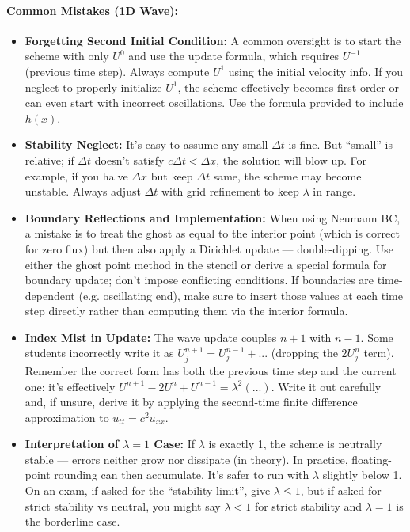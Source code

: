 \documentclass[a4paper,11pt]{article}
\begin{document}
\paragraph{Common Mistakes (1D Wave):}
\begin{itemize}
    \item \textbf{Forgetting Second Initial Condition:} A common oversight is to start the scheme with only $U^0$ and use the update formula, which requires $U^{-1}$ (previous time step). Always compute $U^1$ using the initial velocity info. If you neglect to properly initialize $U^1$, the scheme effectively becomes first-order or can even start with incorrect oscillations. Use the formula provided to include $h(x)$.
    \item \textbf{Stability Neglect:} It’s easy to assume any small $\Delta t$ is fine. But “small” is relative; if $\Delta t$ doesn’t satisfy $c\Delta t < \Delta x$, the solution will blow up. For example, if you halve $\Delta x$ but keep $\Delta t$ same, the scheme may become unstable. Always adjust $\Delta t$ with grid refinement to keep $\lambda$ in range.
    \item \textbf{Boundary Reflections and Implementation:} When using Neumann BC, a mistake is to treat the ghost as equal to the interior point (which is correct for zero flux) but then also apply a Dirichlet update — double-dipping. Use either the ghost point method in the stencil or derive a special formula for boundary update; don’t impose conflicting conditions. If boundaries are time-dependent (e.g. oscillating end), make sure to insert those values at each time step directly rather than computing them via the interior formula.
    \item \textbf{Index Mist in Update:} The wave update couples $n+1$ with $n-1$. Some students incorrectly write it as $U_j^{n+1} = U_j^{n-1} + ...$ (dropping the $2U_j^n$ term). Remember the correct form has both the previous time step and the current one: it’s effectively $U^{n+1} - 2U^n + U^{n-1} = \lambda^2(...)$. Write it out carefully and, if unsure, derive it by applying the second-time finite difference approximation to $u_{tt}=c^2u_{xx}$.
    \item \textbf{Interpretation of $\lambda=1$ Case:} If $\lambda$ is exactly 1, the scheme is neutrally stable — errors neither grow nor dissipate (in theory). In practice, floating-point rounding can then accumulate. It’s safer to run with $\lambda$ slightly below 1. On an exam, if asked for the “stability limit”, give $\lambda \le 1$, but if asked for strict stability vs neutral, you might say $\lambda<1$ for strict stability and $\lambda=1$ is the borderline case.
\end{itemize}
\end{document}
